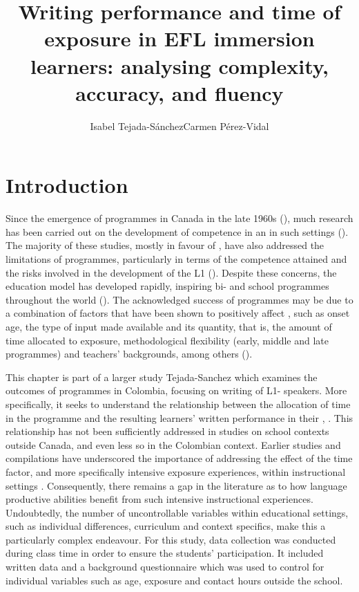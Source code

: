 \documentclass[output=paper]{langsci/langscibook}
\author{Isabel Tejada-Sánchez\affiliation{Universidad de los Andes}\lastand Carmen Pérez-Vidal\affiliation{Universitat Pompeu Fabra} }
\title{Writing performance and time of exposure in EFL immersion learners: analysing complexity, accuracy, and fluency}
\begin{document}
  


\section{Introduction}

Since the emergence of  programmes in Canada in the late 1960s (\citealt{LambertTucker1972}), much research has been carried out on the development of  competence in an  in such settings (\citealt{GeneseeStanley1976,Genesee1978,Swain2000french}). The majority of these studies, mostly in favour of , have also addressed the limitations of  programmes, particularly in terms of the  competence attained and the risks involved in the development of the L1 (\citealt{Genesee1978,Genesee2013,Lazaruk2007}). Despite these concerns, the  education model has developed rapidly, inspiring bi- and  school programmes throughout the world (\citealt{DeMejia2002}). The acknowledged success of  programmes may be due to a combination of factors that have been shown to positively affect  , such as onset age, the type of input made available and its quantity, that is, the amount of time allocated to  exposure, methodological flexibility (early, middle and late programmes) and teachers’ backgrounds, among others (\citealt{Genesee2013,JohnsonSwain1997,Lazaruk2007}). 

This chapter is part of a larger study Tejada-Sanchez \citeyear{Tejada-Sanchez2014} which examines  the outcomes of  programmes in Colombia, focusing on  writing of L1- speakers. More specifically, it seeks to understand the relationship between the allocation of time in the programme and the resulting learners’ written performance in their , . This relationship has not been sufficiently addressed in studies on school  contexts outside Canada, and even less so in the Colombian context. Earlier studies and compilations have underscored the importance of addressing the effect of the time factor, and more specifically intensive exposure experiences, within  instructional settings \citep{Muñoz2012}.  Consequently, there remains a gap in the literature as to how language productive abilities benefit from such intensive instructional experiences. Undoubtedly, the number of uncontrollable variables within educational settings, such as individual differences, curriculum and context specifics, make this a particularly complex endeavour. For this study, data collection was conducted during class time in order to ensure the students’ participation. It included written data and a background questionnaire which was used to control for individual variables such as age,  exposure and  contact hours outside the school.     
\end{document}
